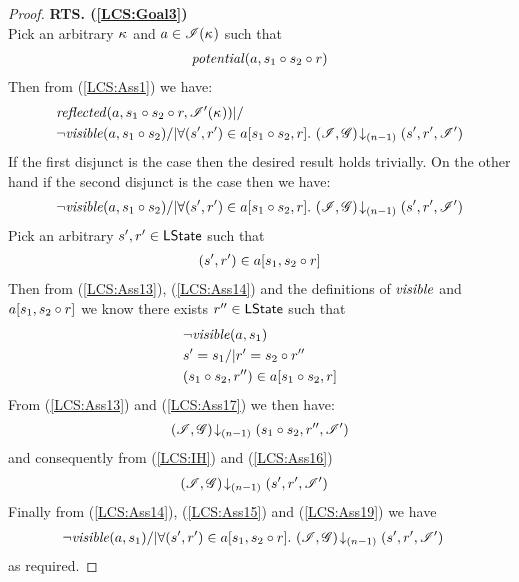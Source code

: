 \begin{lemma}
\begin{proof}
\noindent\textbf{RTS. (\ref{LCS:Goal3})}\\
Pick an arbitrary $\kappa_{}$ and $a \in \mathscr{I}(\kappa_{})$ such that 
\begin{align}
	\mathit{potential}(a, s_1 \circ s_2 \circ r) \label{LCS:Ass12}
\end{align}
Then from (\ref{LCS:Ass1}) we have: 
%
\begin{align*}
  &\m{reflected}(a,s_1 \composeL s_2 \composeL r,\lmod'(\ca{})) |/\null \nonumber \\
%  
  &\neg\m{visible}(a,s_1 \composeL s_2) /| \for{(s', r') \in a[s_1 \composeL s_2, r]}  \extendsAMUpto{\lmod, \gmod}{(n-1)}{s'}{r'}{\lmod'}  \nonumber
\end{align*}
%
If the first disjunct is the case then the desired result holds trivially. On the other hand if the second disjunct is the case then we have:
%
\begin{align}
	\neg\mathit{visible}(a,s_1 \circ s_2) /| \forall (s', r') \in a[s_1 \circ s_2, r].\,  \left(\mathscr{I}, \mathscr{G}\right) \!\downarrow_{(n-1)} \left(s', r', \mathscr{I}'\right)
	\label{LCS:Ass13}
\end{align}
%
Pick an arbitrary $s', r' \in \textsf{LState}$ such that
\begin{align}
	(s', r') \in a[s_1, s_2 \circ r]
	\label{LCS:Ass14}
\end{align}
%
Then from (\ref{LCS:Ass13}), (\ref{LCS:Ass14}) and the definitions of $\mathit{visible}$ and $a[s_1, s_2 \circ r]$ we know there exists $r'' \in \textsf{LState}$ such that
%
\begin{align}
	& \neg\mathit{visible}(a, s_1) \label{LCS:Ass15}\\
	& s' = s_1 /| r' = s_2 \circ r'' \label{LCS:Ass16}\\
	& (s_1 \circ s_2, r'') \in a[s_1 \circ s_2, r] \label{LCS:Ass17} 
\end{align}
%
From (\ref{LCS:Ass13}) and (\ref{LCS:Ass17}) we then have:
%
\begin{align}
	\left(\mathscr{I}, \mathscr{G}\right) \!\downarrow_{(n-1)} \left(s_1 \circ s_2, r'', \mathscr{I}'\right)
	\label{LCS:Ass18}
\end{align}
%
and consequently from (\ref{LCS:IH}) and (\ref{LCS:Ass16})
%
\begin{align}
  & \left(\mathscr{I}, \mathscr{G}\right) \!\downarrow_{(n-1)} \left(s', r', \mathscr{I}'\right)  \label{LCS:Ass19}
\end{align}
%
Finally from (\ref{LCS:Ass14}), (\ref{LCS:Ass15}) and (\ref{LCS:Ass19}) we have
%
\begin{align*}
  &\neg\mathit{visible}(a,s_1) /| \forall (s', r') \in a[s_1, s_2 \circ r].\, \left(\mathscr{I}, \mathscr{G}\right) \!\downarrow_{(n-1)} \left(s', r', \mathscr{I}'\right)  \nonumber
\end{align*}
%
as required.
%
\end{proof}
\end{lemma}
%
%